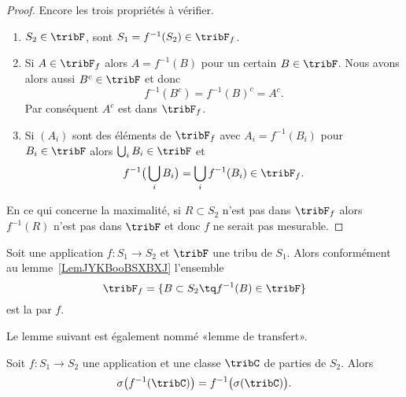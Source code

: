 \begin{proof}
	Encore les trois propriétés à vérifier.
	\begin{enumerate}
		\item
		      \( S_2\in\tribF\), sont \( S_1=f^{-1}(S_2)\in \tribF_f\).
		\item
		      Si \( A\in \tribF_f\) alors \( A=f^{-1}(B)\) pour un certain \( B\in \tribF\). Nous avons alors aussi \( B^c\in \tribF\) et donc
		      \begin{equation}
			      f^{-1}(B^c)=f^{-1}(B)^c=A^c.
		      \end{equation}
		      Par conséquent \( A^c\) est dans \( \tribF_f\).
		\item
		      Si \( (A_i)\) sont des éléments de \( \tribF_f\) avec \( A_i=f^{-1}(B_i)\) pour \( B_i\in \tribF\) alors \( \bigcup_iB_i\in\tribF\) et
		      \begin{equation}
			      f^{-1}\big( \bigcup_iB_i \big)=\bigcup_if^{-1}(B_i)\in\tribF_f.
		      \end{equation}
	\end{enumerate}
	En ce qui concerne la maximalité, si \( R\subset S_2\) n'est pas dans \( \tribF_f\) alors \( f^{-1}(R)\) n'est pas dans \( \tribF\) et donc \( f\) ne serait pas mesurable.
\end{proof}

\begin{definition}     \label{DefNOJWooLGKhmJ}
	Soit une application \( f\colon S_1\to S_2\) et \( \tribF\) une tribu de \( S_1\). Alors conformément au lemme~\ref{LemJYKBooBSXBXJ} l'ensemble
	\begin{equation}
		\tribF_f=\{  B\subset S_2\tq f^{-1}(B)\in \tribF  \}
	\end{equation}
	est la  par \( f\).
\end{definition}

Le lemme suivant est également nommé «lemme de transfert».
\begin{lemma}       \label{LemOQTBooWGYuDU}
	Soit \( f\colon S_1\to S_2\) une application et une classe \( \tribC\) de parties de \( S_2\). Alors
	\begin{equation}
		\sigma\big( f^{-1}(\tribC) \big)=f^{-1}\big( \sigma(\tribC) \big).
	\end{equation}
\end{lemma}

